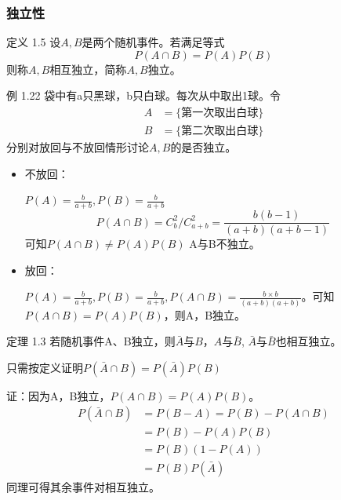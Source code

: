 \documentclass{beamer}
\begin{document}
	\begin{frame}
		\frametitle{独立性}
		定义 1.5 设$A, B$是两个随机事件。若满足等式
		\[
		P(A \cap B) = P(A) P(B)
		\]
		则称$A, B$相互独立，简称$A, B$独立。
		
		\vspace{1cm}
		例 1.22 袋中有a只黑球，b只白球。每次从中取出1球。令
		\begin{align}
			A & = \{\text{第一次取出白球}\} \\
			B & = \{\text{第二次取出白球}\}
		\end{align}
		分别对放回与不放回情形讨论$A, B$的是否独立。
	\end{frame}
	
	\begin{frame}
		\begin{itemize}
			\item 不放回：
			
			$P(A) = \frac{b}{a + b}, P(B) = \frac{b}{a + b}$
			\[
			P(A \cap B) = C_b^2 / C_{a + b}^2 = \frac{b(b - 1)}{(a + b)(a + b -1)}
			\]
			可知$P(A \cap B) \neq P(A) P(B)$ A与B不独立。
			
			\item 放回：
			
			$P(A) = \frac{b}{a + b}, P(B) = \frac{b}{a + b}, P(A \cap B) = \frac{b \times b}{(a + b)(a + b)}$。可知$P(A \cap B) = P(A)P(B)$，则A，B独立。
			
		\end{itemize}
	\end{frame}
	
	\begin{frame}
		定理 1.3 若随机事件A、B独立，则$\bar{A} \text{与} B$，$A \text{与} \bar{B}$, $\bar{A} \text{与} \bar{B}$也相互独立。
		
		只需按定义证明$P(\bar{A} \cap B) = P(\bar{A}) P(B)$
		
		证：因为A，B独立，$P(A \cap B) = P(A) P(B)$。
		\begin{align}
			P(\bar{A} \cap B) & = P(B - A) = P(B) - P(A \cap B) \\
			& = P(B) - P(A)P(B) \\
			& = P(B)(1 - P(A)) \\
			& = P(B)P(\bar{A})
		\end{align}
		同理可得其余事件对相互独立。
	\end{frame}
	
\end{document}
